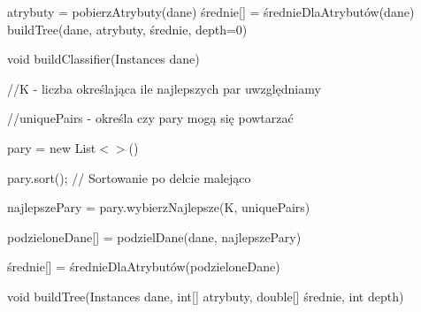 \documentclass[12pt]{article}
\begin{document}
 

\begin{algorithm}[H]
\SetAlgoLined
 atrybuty = pobierzAtrybuty(dane)\;
 średnie[] = średnieDlaAtrybutów(dane)\;
 buildTree(dane, atrybuty, średnie, depth=0)\;
 \caption{void buildClassifier(Instances dane)}
\end{algorithm}

\begin{algorithm}[H]
\SetAlgoLined

 //K - liczba określająca ile najlepszych par uwzględniamy\;

 //uniquePairs - określa czy pary mogą się powtarzać\;

 
 pary = new List$<>$()\;
 
 
 pary.sort(); // Sortowanie po delcie malejąco
 
 najlepszePary = pary.wybierzNajlepsze(K, uniquePairs)\;
 
 podzieloneDane[] = podzielDane(dane, najlepszePary)\;
 
 średnie[] = średnieDlaAtrybutów(podzieloneDane)\;
 
 
 \caption{void buildTree(Instances dane, int[] atrybuty, double[] średnie, int depth)}
\end{algorithm}
\end{document}
